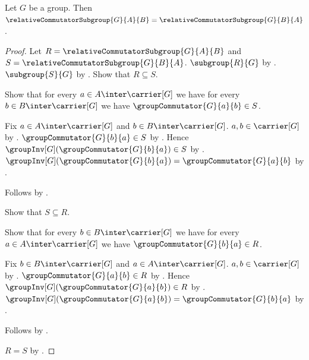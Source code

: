 \begin{theorem}\label{relative_commutator_subgroup_symmetric}
    Let $G$ be a group.
    Then
        $\relativeCommutatorSubgroup{G}{A}{B}=
         \relativeCommutatorSubgroup{G}{B}{A}$.
\end{theorem}
\begin{proof}
    Let $R=\relativeCommutatorSubgroup{G}{A}{B}$ and
        $S=\relativeCommutatorSubgroup{G}{B}{A}$.
    $\subgroup{R}{G}$ by
        .
    $\subgroup{S}{G}$ by
        .
    Show that $R\subseteq S$.
    \begin{subproof}
        Show that for every $a\in A\inter\carrier[G]$ we have for every
            $b\in B\inter\carrier[G]$ we have
            $\groupCommutator{G}{a}{b}\in S$.
        \begin{subproof}
            Fix $a\in A\inter\carrier[G]$ and
                $b\in B\inter\carrier[G]$.
            $a,b\in\carrier[G]$ by .
            $\groupCommutator{G}{b}{a}\in S$ by
                .
            Hence
                $\groupInv[G](\groupCommutator{G}{b}{a})\in S$ by
                .
            $\groupInv[G](\groupCommutator{G}{b}{a})=
                \groupCommutator{G}{a}{b}$ by
                .
        \end{subproof}
        Follows by .
    \end{subproof}
    Show that $S\subseteq R$.
    \begin{subproof}
        Show that for every $b\in B\inter\carrier[G]$ we have for every
            $a\in A\inter\carrier[G]$ we have
            $\groupCommutator{G}{b}{a}\in R$.
        \begin{subproof}
            Fix $b\in B\inter\carrier[G]$ and
                $a\in A\inter\carrier[G]$.
            $a,b\in\carrier[G]$ by .
            $\groupCommutator{G}{a}{b}\in R$ by
                .
            Hence
                $\groupInv[G](\groupCommutator{G}{a}{b})\in R$ by
                .
            $\groupInv[G](\groupCommutator{G}{a}{b})=
                \groupCommutator{G}{b}{a}$ by
                .
        \end{subproof}
        Follows by .
    \end{subproof}
    $R=S$ by .
\end{proof}

